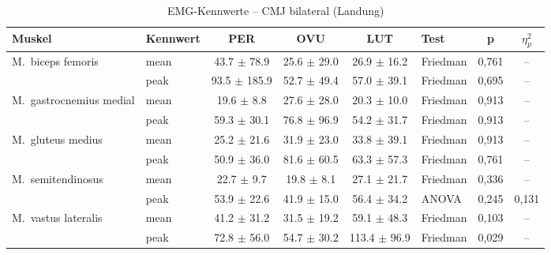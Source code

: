 \begin{table}[H]
  \centering
  \caption{EMG-Kennwerte – CMJ bilateral (Landung)}
  \label{tab:CMJ_bilateral_Landung}
  \small
  \begin{tabular}{l l c c c l c c}
    \hline
    \textbf{Muskel} & \textbf{Kennwert} & \textbf{PER} & \textbf{OVU} & \textbf{LUT} & \textbf{Test} & \textbf{p} & \textbf{$\eta^2_p$} \\
    \hline
    M.~biceps femoris & mean & 43.7 $\pm$ 78.9 & 25.6 $\pm$ 29.0 & 26.9 $\pm$ 16.2 & Friedman & 0{,}761 & -- \\
     & peak & 93.5 $\pm$ 185.9 & 52.7 $\pm$ 49.4 & 57.0 $\pm$ 39.1 & Friedman & 0{,}695 & -- \\
    \hline
    M.~gastrocnemius medial & mean & 19.6 $\pm$ 8.8 & 27.6 $\pm$ 28.0 & 20.3 $\pm$ 10.0 & Friedman & 0{,}913 & -- \\
     & peak & 59.3 $\pm$ 30.1 & 76.8 $\pm$ 96.9 & 54.2 $\pm$ 31.7 & Friedman & 0{,}913 & -- \\
    \hline
    M.~gluteus medius & mean & 25.2 $\pm$ 21.6 & 31.9 $\pm$ 23.0 & 33.8 $\pm$ 39.1 & Friedman & 0{,}913 & -- \\
     & peak & 50.9 $\pm$ 36.0 & 81.6 $\pm$ 60.5 & 63.3 $\pm$ 57.3 & Friedman & 0{,}761 & -- \\
    \hline
    M.~semitendinosus & mean & 22.7 $\pm$ 9.7 & 19.8 $\pm$ 8.1 & 27.1 $\pm$ 21.7 & Friedman & 0{,}336 & -- \\
     & peak & 53.9 $\pm$ 22.6 & 41.9 $\pm$ 15.0 & 56.4 $\pm$ 34.2 & ANOVA & 0{,}245 & 0{,}131 \\
    \hline
    M.~vastus lateralis & mean & 41.2 $\pm$ 31.2 & 31.5 $\pm$ 19.2 & 59.1 $\pm$ 48.3 & Friedman & 0{,}103 & -- \\
     & peak & 72.8 $\pm$ 56.0 & 54.7 $\pm$ 30.2 & 113.4 $\pm$ 96.9 & Friedman & 0{,}029 & -- \\
    \hline
  \end{tabular}
\end{table}

